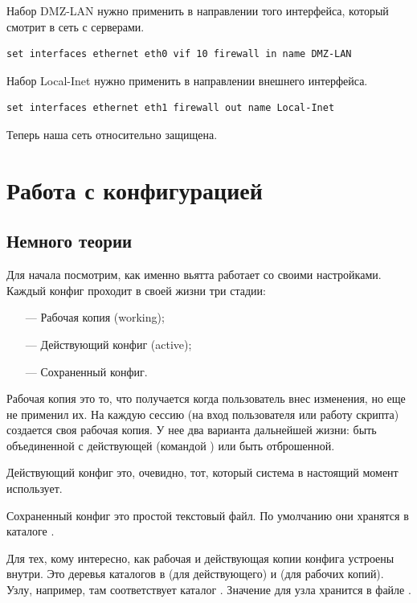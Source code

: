 \documentclass[a4paper,12pt, twoside, russian]{report}
\begin{document}
Набор DMZ-LAN нужно применить в направлении  того интерфейса, который смотрит в сеть с серверами.
\begin{verbatim}
set interfaces ethernet eth0 vif 10 firewall in name DMZ-LAN
\end{verbatim}

Набор Local-Inet нужно применить в направлении  внешнего интерфейса.
\begin{verbatim}
set interfaces ethernet eth1 firewall out name Local-Inet
\end{verbatim}

Теперь наша сеть относительно защищена.

\chapter{Работа с конфигурацией}
\section{Немного теории}
Для начала посмотрим, как именно вьятта работает со своими настройками. Каждый конфиг проходит
в своей жизни три стадии: 
\begin{itemize}
 \item[---] Рабочая копия (working);
 \item[---] Действующий конфиг (active);
 \item[---] Сохраненный конфиг.
\end{itemize}

Рабочая копия это то, что получается когда пользователь внес изменения, но еще не применил их.
На каждую сессию (на вход пользователя или работу скрипта) создается своя рабочая копия. 
У нее два варианта дальнейшей жизни: быть объединенной с действующей (командой )
или быть отброшенной.

Действующий конфиг это, очевидно, тот, который система в настоящий момент использует.

Сохраненный конфиг это простой текстовый файл. По умолчанию они хранятся в каталоге 
.

Для тех, кому интересно, как рабочая и действующая копии конфига устроены внутри. 
Это деревья каталогов в  (для действующего) и 
(для рабочих копий). Узлу, например,  там соответствует каталог
. Значение для узла хранится в файле .
\end{document}
